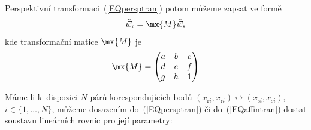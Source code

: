 Perspektivní transformaci~(\ref{EQpersptran}) potom můžeme zapsat ve formě
\begin{equation} \label{HOM3rs}
  \tilde{\vec{w}}_{\mathrm{r}} = \mx{M} \tilde{\vec{w}}_{\mathrm{s}}
\end{equation}
kde transformační matice $\mx{M}$ je
\begin{equation}                                                \label{HOMmtxM}
  \mx{M} =
  \begin{pmatrix}
    a & b & c\\
    d & e & f\\
    g & h & 1
  \end{pmatrix}
\end{equation}

Máme-li k~dispozici $N$ párů korespondujících bodů
$(x_{\mathrm{r}i},x_{\mathrm{r}i})\leftrightarrow
(x_{\mathrm{s}i},x_{\mathrm{s}i})$, $i\in\{1,\ldots,N\}$, můžeme dosazením
do~(\ref{EQpersptran}) či do~(\ref{EQaffintran}) dostat soustavu lineárních
rovnic pro její parametry:
